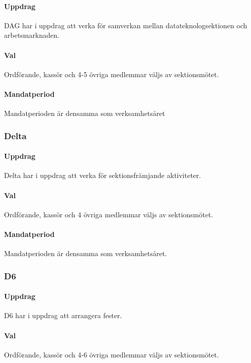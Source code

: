 \documentclass[a4paper, 10pt]{article}
\begin{document}
\paragraph{Uppdrag\\} 
DAG har i uppdrag att verka för samverkan mellan datateknologsektionen och arbetsmarknaden. 
\paragraph{Val\\}
Ordförande, kassör och 4-5 övriga medlemmar väljs av sektionsmötet.
\paragraph{Mandatperiod\\}
Mandatperioden är densamma som verksamhetsåret
\subsubsection{Delta}
\paragraph{Uppdrag\\}
Delta har i uppdrag att verka för sektionsfrämjande aktiviteter. 
\paragraph{Val\\}
Ordförande, kassör och 4 övriga medlemmar väljs av sektionsmötet. 
\paragraph{Mandatperiod\\}
Mandatperioden är densamma som verksamhetsåret. 
\subsubsection{D6}
\paragraph{Uppdrag\\}
D6 har i uppdrag att arrangera fester. 
\paragraph{Val\\}
Ordförande, kassör och 4-6 övriga medlemmar väljs av sektionsmötet. 
\end{document}
